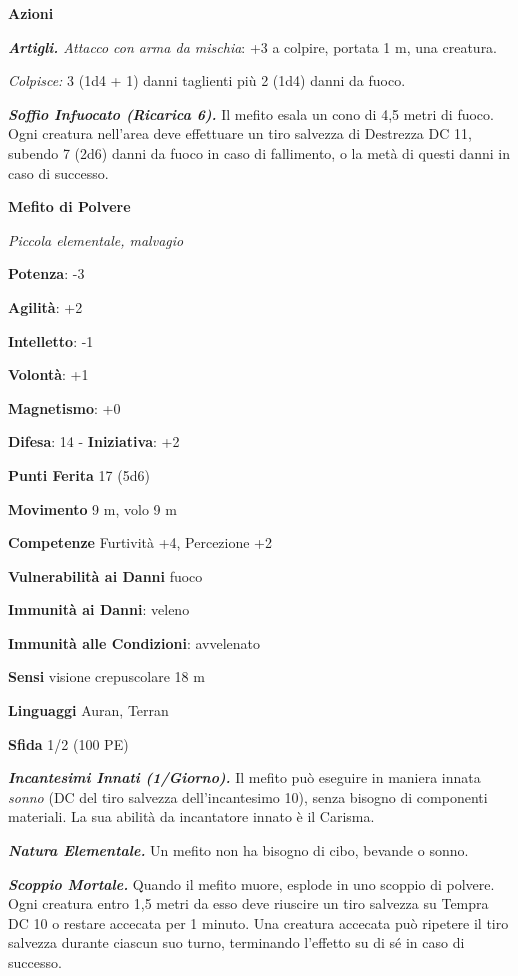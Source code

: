\begin{multicols}{2}
\smallskip\textbf{Azioni}

\emph{\textbf{Artigli.} Attacco con arma da mischia}: +3 a colpire,
portata 1 m, una creatura.

\emph{Colpisce:} 3 (1d4 + 1) danni taglienti più 2 (1d4) danni da fuoco.

\emph{\textbf{Soffio Infuocato (Ricarica 6).}} Il mefito esala un cono
di 4,5 metri di fuoco. Ogni creatura nell'area deve effettuare un tiro
salvezza di Destrezza DC 11, subendo 7 (2d6) danni da fuoco in caso di
fallimento, o la metà di questi danni in caso di successo.



\textbf{Mefito di Polvere}

\emph{Piccola elementale, malvagio}

\textbf{Potenza}: -3

\textbf{Agilità}: +2

\textbf{Intelletto}: -1

\textbf{Volontà}: +1

\textbf{Magnetismo}: +0

\textbf{Difesa}: 14 - \textbf{Iniziativa}: +2

\textbf{Punti Ferita} 17 (5d6)

\textbf{Movimento} 9 m, volo 9 m

\textbf{Competenze} Furtività +4, Percezione +2

\textbf{Vulnerabilità ai Danni} fuoco

\textbf{Immunità ai Danni}: veleno

\textbf{Immunità alle Condizioni}: avvelenato

\textbf{Sensi} visione crepuscolare 18 m

\textbf{Linguaggi} Auran, Terran

\textbf{Sfida} 1/2 (100 PE)\smallskip

\emph{\textbf{Incantesimi Innati (1/Giorno).}} Il mefito può eseguire in
maniera innata \emph{sonno} (DC del tiro salvezza dell'incantesimo 10),
senza bisogno di componenti materiali. La sua abilità da incantatore
innato è il Carisma.

\emph{\textbf{Natura Elementale.}} Un mefito non ha bisogno di cibo,
bevande o sonno.

\emph{\textbf{Scoppio Mortale.}} Quando il mefito muore, esplode in uno
scoppio di polvere. Ogni creatura entro 1,5 metri da esso deve riuscire
un tiro salvezza su Tempra DC 10 o restare accecata per 1 minuto.
Una creatura accecata può ripetere il tiro salvezza durante ciascun suo
turno, terminando l'effetto su di sé in caso di successo.


\end{multicols}
